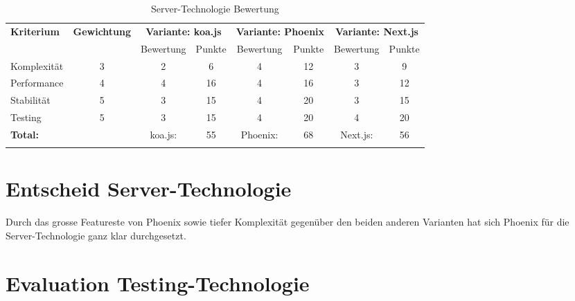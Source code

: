 \begin{longtable}[]{@{}p{2cm}ccccccc@{}}
  \toprule
  \textbf{Kriterium} & \textbf{Gewichtung} & \multicolumn{2}{c}{\textbf{Variante: koa.js}} & \multicolumn{2}{c}{\textbf{Variante: Phoenix}} & \multicolumn{2}{c}{\textbf{Variante: Next.js}}\tabularnewline
                     &                     & Bewertung                                     & Punkte                                         & Bewertung                                                     & Punkte & Bewertung & Punkte \tabularnewline
  \midrule
  \endhead
  Komplexität        & 3                   & 2                                             & 6                                              & 4                                                             & 12     & 3         & 9 \tabularnewline
  Performance        & 4                   & 4                                             & 16                                             & 4                                                             & 16     & 3         & 12 \tabularnewline
  Stabilität         & 5                   & 3                                             & 15                                             & 4                                                             & 20     & 3         & 15 \tabularnewline
  Testing            & 5                   & 3                                             & 15                                             & 4                                                             & 20     & 4         & 20 \tabularnewline
  \midrule
  \textbf{Total:}    &                     & koa.js:                                       & 55                                             & Phoenix:                                                      & 68     & Next.js:  & 56 \tabularnewline
  \bottomrule
  \caption{Server-Technologie Bewertung}
\end{longtable}

\section{Entscheid Server-Technologie}\label{entscheid-server-technologie}

Durch das grosse Featureste von Phoenix sowie tiefer Komplexität gegenüber den
beiden anderen Varianten hat sich Phoenix für die Server-Technologie ganz klar
durchgesetzt.

\clearpage
\section{Evaluation Testing-Technologie}\label{evaluation-testing-technologie}

